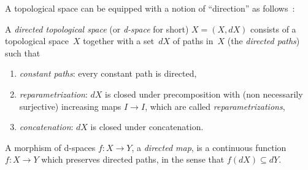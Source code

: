 \documentclass[orivec]{llncs} \usepackage[T1]{fontenc}
\newcommand{\comment}[1]{}
\newcommand\set[1]{\{#1\}}
\newcommand\setof[2]{\set{#1\ /\ #2}}
\newcommand{\R}{\mathbb{R}}
\newcommand{\nbd}{\nobreakdash-\hspace{0pt}}
\newcommand{\ce}{\mathop{\mathrm{e}}}
\newcommand{\ci}{\mathrm{i}}
\renewcommand{\leq}{\leqslant}
\begin{document}
A topological space can be equipped with a notion of ``direction'' as
follows~\cite{grandis}:

\begin{definition}
  A \emph{directed topological space} (or \emph{d-space} for short) $X=(X,dX)$
  consists of a topological space~$X$ together with a set~$dX$ of paths in~$X$
  (the \emph{directed paths}) such that
  \begin{enumerate}
  \item \emph{constant paths}: every constant path is directed,
  \item \emph{reparametrization}: $dX$ is closed under precomposition with (non
    necessarily surjective) increasing maps \hbox{$I\to I$}, which are called
    \emph{reparametrizations},
  \item \emph{concatenation}: $dX$ is closed under concatenation.
  \end{enumerate}
  A morphism of d-spaces $f:X\to Y$, a \emph{directed map}, is a continuous
  function \hbox{$f:X\to Y$} which preserves directed paths, in the sense that
  $f(dX)\subseteq dY$.
\end{definition}

\comment{\begin{example}
  Every topological space~$X$ equipped with a partial order~$\leq$ defines a
  d\nbd{}space by taking~$dX$ the set of paths~$p:I\to X$ which are increasing.
In particular, we often write~$\dui$ for the d-space induced by the unit
  interval \hbox{$I=[0,1]$} equipped with the usual total order. Notice that
  given a d-space~$X$, the maps \hbox{$p:\dui\to X$} are the directed paths
  in~$dX$ and the maps~$r:\dui\to\dui$ are the reparametrizations.
\end{example}
}


\comment{\begin{wrapfigure}{r}{1cm}
  \vspace{-2.5ex}
  \begin{tikzpicture}[scale=0.5]
    \draw (1,1) circle (1);
    \draw[->] (2,1.01) -- (2,0.99);
    \draw[->] (0,0.99) -- (0,1.01);
  \end{tikzpicture}
\end{wrapfigure}
The circle~$S^1=\setof{\ce^{\ci\theta}}{0\leq\theta<2\pi}$ in the complex plane
can be equipped with a structure of d-space with~$dS^1$ being the set of
paths~$p$ of the form~$p(t)=\ce^{\ci f(t)}$ for some increasing
function~$f:I\to\R$. Notice that in this case, the structure of directed spaces
is not induced by a partial order on the space, which makes d-spaces a more
general notion. \bigskip
}
\end{document}
